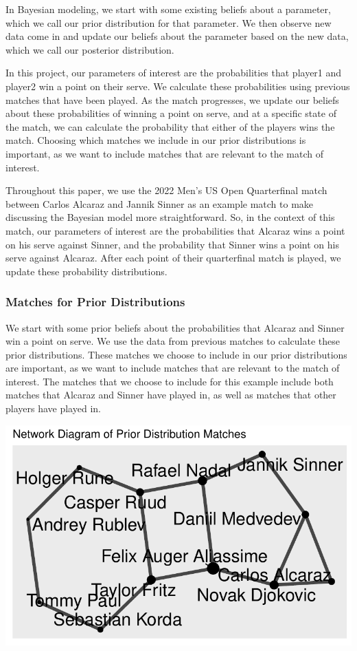\documentclass[
  letterpaper,
  DIV=11,
  numbers=noendperiod]{scrartcl}
\begin{document}
In Bayesian modeling, we start with some existing beliefs about a
parameter, which we call our prior distribution for that parameter. We
then observe new data come in and update our beliefs about the parameter
based on the new data, which we call our posterior distribution.

In this project, our parameters of interest are the probabilities that
player1 and player2 win a point on their serve. We calculate these
probabilities using previous matches that have been played. As the match
progresses, we update our beliefs about these probabilities of winning a
point on serve, and at a specific state of the match, we can calculate
the probability that either of the players wins the match. Choosing
which matches we include in our prior distributions is important, as we
want to include matches that are relevant to the match of interest.

Throughout this paper, we use the 2022 Men's US Open Quarterfinal match
between Carlos Alcaraz and Jannik Sinner as an example match to make
discussing the Bayesian model more straightforward. So, in the context
of this match, our parameters of interest are the probabilities that
Alcaraz wins a point on his serve against Sinner, and the probability
that Sinner wins a point on his serve against Alcaraz. After each point
of their quarterfinal match is played, we update these probability
distributions.

\subsubsection{Matches for Prior
Distributions}\label{matches-for-prior-distributions}

We start with some prior beliefs about the probabilities that Alcaraz
and Sinner win a point on serve. We use the data from previous matches
to calculate these prior distributions. These matches we choose to
include in our prior distributions are important, as we want to include
matches that are relevant to the match of interest. The matches that we
choose to include for this example include both matches that Alcaraz and
Sinner have played in, as well as matches that other players have played
in.

\linespread{0.9}

\includegraphics{Project_Write_Up_files/figure-pdf/unnamed-chunk-7-1.pdf}
\end{document}
